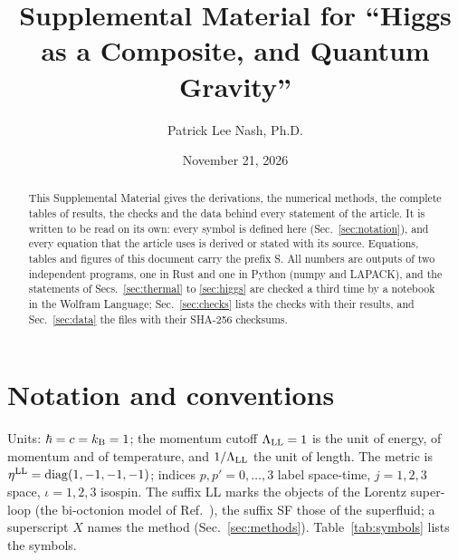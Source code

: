 \documentclass[aps,prd,onecolumn,superscriptaddress,nofootinbib,floatfix,longbibliography]{revtex4-2}
\newcommand{\LL}{{\rm LL}}
\begin{document}
\title{Supplemental Material for ``Higgs as a Composite, and Quantum Gravity''}

\author{Patrick Lee Nash, Ph.D.}

\date{November 21, 2026}

\begin{abstract}
This Supplemental Material gives the derivations, the numerical methods, the complete tables of results, the checks and
the data behind every statement of the article. It is written to be read on its own: every symbol is defined here
(Sec.~\ref{sec:notation}), and every equation that the article uses is derived or stated with its source. Equations,
tables and figures of this document carry the prefix S. All numbers are outputs of two independent programs, one in Rust
and one in Python (numpy and LAPACK), and the statements of Secs.~\ref{sec:thermal} to \ref{sec:higgs} are checked a third
time by a notebook in the Wolfram Language; Sec.~\ref{sec:checks} lists the checks with their results, and
Sec.~\ref{sec:data} the files with their SHA-256 checksums.
\end{abstract}

\maketitle

\tableofcontents

\section{Notation and conventions}
\label{sec:notation}

Units: $\hbar=c=k_{\rm B}=1$; the momentum cutoff $\Lambda_\LL=1$ is the unit of energy, of momentum and of temperature, and
$1/\Lambda_\LL$ the unit of length. The metric is $\eta^\LL={\rm diag}(1,-1,-1,-1)$; indices $p,p'=0,\dots,3$ label space-time,
$j=1,2,3$ space, $\iota=1,2,3$ isospin. The suffix LL marks the objects of the Lorentz super-loop (the bi-octonion model of
Ref.~\cite{Nash2026}), the suffix SF those of the superfluid; a superscript $X$ names the method (Sec.~\ref{sec:methods}).
Table~\ref{tab:symbols} lists the symbols.
\end{document}
